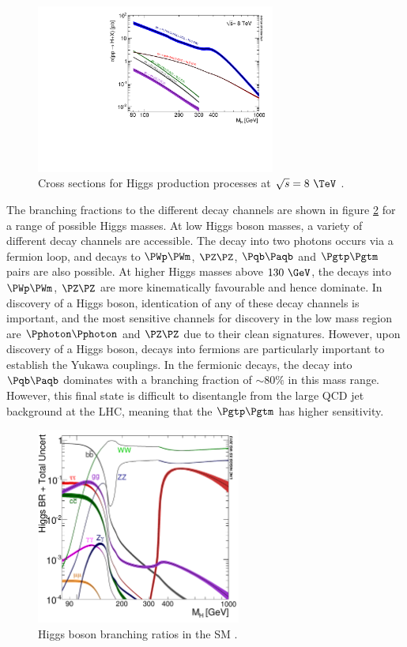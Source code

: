 \begin{figure}[htbp]
   \includegraphics[width=0.7\textwidth]{plots/theory/Higgs_XS_8TeV_lx.pdf}
\caption{Cross sections for Higgs production processes at $\sqrt{s}=8~\TeV$
\cite{Heinemeyer:2013tqa}.}
\label{fig:SMHiggsXS}
\end{figure}

The branching fractions to the different decay channels are shown in
figure \ref{fig:SMHiggsBRs} for a range of possible Higgs masses. At low Higgs
boson masses, a variety of different decay channels are accessible. The decay
into two photons occurs via a fermion loop, and decays to $\PWp\PWm$, $\PZ\PZ$,
$\Pqb\Paqb$ and $\Pgtp\Pgtm$ pairs are also possible. At higher Higgs masses
above $130~\GeV$, the decays into $\PWp\PWm$, $\PZ\PZ$ are more kinematically
favourable and hence dominate. In discovery of a Higgs boson, identication of
any of these decay channels is important, and the most sensitive channels for
discovery in the low mass region are $\Pphoton\Pphoton$ and $\PZ\PZ$ due to
their clean signatures. However,
upon discovery of a Higgs boson, decays into fermions are particularly important
to establish the Yukawa couplings. In the fermionic decays, the decay into
$\Pqb\Paqb$ dominates with a branching fraction of $\sim 80\%$ in this mass
range. However, this final state is difficult to disentangle from the large QCD
jet background at the LHC, meaning that the $\Pgtp\Pgtm$ has higher sensitivity.

\begin{figure}[htbp]
   \includegraphics[width=0.6\textwidth]{plots/theory/Higgs_BR.pdf}
\caption{Higgs boson branching ratios in the SM \cite{Heinemeyer:2013tqa}.}
\label{fig:SMHiggsBRs}
\end{figure}

